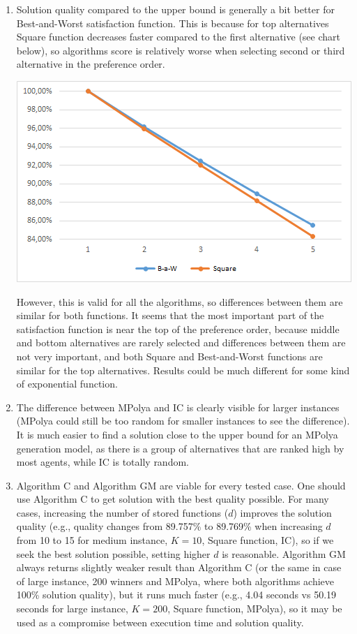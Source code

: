 \begin{enumerate}
	\item Solution quality compared to the upper bound is generally a bit better for Best-and-Worst satisfaction function. This is because for top alternatives Square function decreases faster compared to the first alternative (see chart below), so algorithms score is relatively worse when selecting second or third alternative in the preference order.
	\begin{center}
		\includegraphics[scale=0.75]{satfuncomp1}
	\end{center}
	However, this is valid for all the algorithms, so differences between them are similar for both functions. It seems that the most important part of the satisfaction function is near the top of the preference order, because middle and bottom alternatives are rarely selected and differences between them are not very important, and both Square and Best-and-Worst functions are similar for the top alternatives. Results could be much different for some kind of exponential function.
	\item The difference between MPolya and IC is clearly visible for larger instances (MPolya could still be too random for smaller instances to see the difference). It is much easier to find a solution close to the upper bound for an MPolya generation model, as there is a group of alternatives that are ranked high by most agents, while IC is totally random.
	\item Algorithm C and Algorithm GM are viable for every tested case. One should use Algorithm C to get solution with the best quality possible. For many cases, increasing the number of stored functions ($d$) improves the solution quality (e.g., quality changes from 89.757\% to 89.769\% when increasing $d$ from 10 to 15 for medium instance, $K = 10$, Square function, IC), so if we seek the best solution possible, setting higher $d$ is reasonable. Algorithm GM always returns slightly weaker result than Algorithm C (or the same in case of large instance, 200 winners and MPolya, where both algorithms achieve 100\% solution quality), but it runs much faster (e.g., 4.04 seconds vs 50.19 seconds for large instance, $K = 200$, Square function, MPolya), so it may be used as a compromise between execution time and solution quality.

\end{enumerate}
